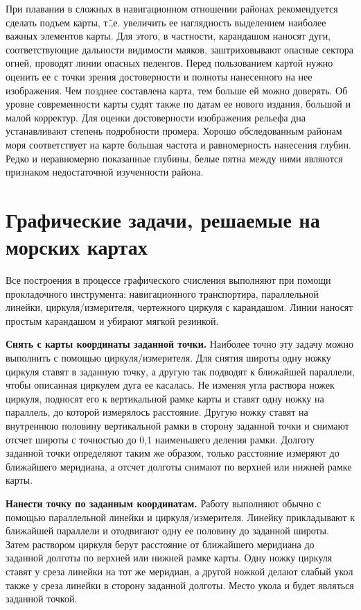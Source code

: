 При плавании в сложных в навигационном отношении районах рекомендуется сделать подъем карты, т.\=,е. увеличить ее наглядность выделением наиболее важных элементов карты. Для этого, в частности, карандашом наносят дуги, соответствующие дальности видимости маяков, заштриховывают опасные сектора огней, проводят линии опасных пеленгов. Перед пользованием картой нужно оценить ее с точки зрения достоверности и полноты нанесенного на нее изображения. Чем позднее составлена карта, тем больше ей можно доверять. Об уровне современности карты судят также по датам ее нового издания, большой и малой корректур. Для оценки достоверности изображения рельефа дна устанавливают степень подробности промера. Хорошо обследованным районам моря соответствует на карте большая частота и равномерность нанесения глубин. Редко и неравномерно показанные глубины, белые пятна между ними являются признаком недостаточной изученности района. 

\section{Графические задачи, решаемые на морских картах}

Все построения в процессе графического счисления выполняют при помощи прокладочного инструмента: навигационного транспортира, параллельной линейки, циркуля\-/измерителя, чертежного циркуля с карандашом. Линии наносят простым карандашом и убирают мягкой резинкой. 

\textbf{Снять с карты координаты заданной точки.} Наиболее точно эту задачу можно выполнить с помощью циркуля\-/измерителя. Для снятия широты одну ножку циркуля ставят в заданную точку, а другую так подводят к ближайшей параллели, чтобы описанная циркулем дуга ее касалась. Не изменяя угла раствора ножек циркуля, подносят его к вертикальной рамке карты и ставят одну ножку на параллель, до которой измерялось расстояние. Другую ножку ставят на внутреннюю половину вертикальной рамки в сторону заданной точки и снимают отсчет широты с точностью до 0,1 наименьшего деления рамки. Долготу заданной точки определяют таким же образом, только расстояние измеряют до ближайшего меридиана, а отсчет долготы снимают по верхней или нижней рамке карты. 

\textbf{Нанести точку по заданным координатам.} Работу выполняют обычно с помощью параллельной линейки и циркуля\-/измерителя. Линейку прикладывают к ближайшей параллели и отодвигают одну ее половину до заданной широты. Затем раствором циркуля берут расстояние от ближайшего меридиана до заданной долготы по верхней или нижней рамке карты. Одну ножку циркуля ставят у среза линейки на тот же меридиан, а другой ножкой делают слабый укол также у среза линейки в сторону заданной долготы. Место укола и будет являться заданной точкой.


